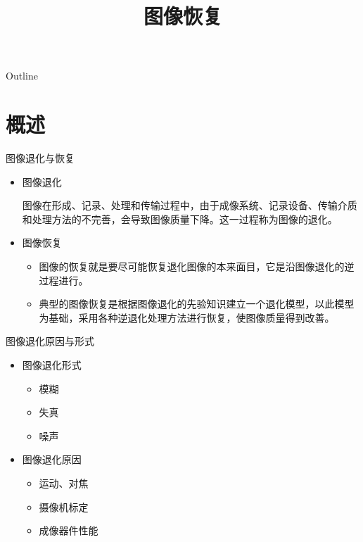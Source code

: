 \documentclass[presentation]{beamer}
\date{}
\title{图像恢复}
\begin{document}
\maketitle
\begin{frame}{Outline}
\tableofcontents
\end{frame}











\section{概述}
\label{sec:org71b5b98}
\begin{frame}[label={sec:org3007c8f}]{图像退化与恢复}
\begin{itemize}
\item 图像退化

图像在形成、记录、处理和传输过程中，由于成像系统、记录设备、传输介质和处理方法的不完善，会导致图像质量下降。这一过程称为图像的退化。

\item 图像恢复
\begin{itemize}
\item 图像的恢复就是要尽可能恢复退化图像的本来面目，它是沿图像退化的逆过程进行。
\item 典型的图像恢复是根据图像退化的先验知识建立一个退化模型，以此模型为基础，采用各种逆退化处理方法进行恢复，使图像质量得到改善。
\end{itemize}
\end{itemize}
\end{frame}
\begin{frame}[label={sec:org9b0df41}]{图像退化原因与形式}
\begin{itemize}
\item 图像退化形式
\begin{itemize}
\item 模糊
\item 失真
\item 噪声
\end{itemize}
\item 图像退化原因
\begin{itemize}
\item 运动、对焦
\item 摄像机标定
\item 成像器件性能
\end{itemize}
\end{itemize}
\end{frame}
\end{document}
